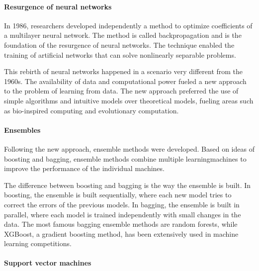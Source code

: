 %

\paragraph{Resurgence of neural networks}

In 1986, researchers developed independently a method to optimize coefficients of a
multilayer neural
network.  The method is called backpropagation and
is the foundation of the resurgence of neural networks.  The technique enabled the
training of artificial networks that can solve nonlinearly separable problems.

This rebirth of neural networks happened in a scenario very different from the 1960s.
The availability of data and computational power fueled a new approach to the problem of
learning from data.  The new approach preferred the use of simple algorithms and
intuitive models over theoretical models, fueling areas such as bio-inspired computing and
evolutionary computation.

\paragraph{Ensembles}

Following the new approach, ensemble methods were developed.  Based on ideas of
boosting and bagging, ensemble
methods combine multiple \glspl{learningmachine} to improve the performance of the individual
machines.

The difference between boosting and bagging is the way the ensemble is built.  In
boosting, the ensemble is built sequentially, where each new model tries to correct the
errors of the previous models.  In bagging, the ensemble is built in parallel, where each
model is trained independently with small changes in the data.  The most famous bagging
ensemble methods are random forests, while XGBoost, a gradient
boosting method, has been extensively used in machine learning
competitions.

\paragraph{Support vector machines}

